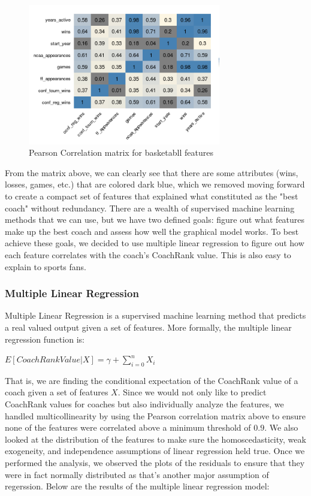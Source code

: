 \documentclass[titlepage,11pt]{article}
\begin{document}
\begin{figure}[H]
      \caption{Pearson Correlation matrix for basketabll features}
      \centering
      \includegraphics[width=0.75\textwidth]{bball_cor.png}
\end{figure}

\noindent From the matrix above, we can clearly see that there are some attributes (wins, losses, games, etc.) that are colored dark blue, which we removed moving forward to create a compact set of features that explained what constituted as the "best coach" without redundancy. There are a wealth of supervised machine learning methods that we can use, but we have two defined goals: figure out what features make up the best coach and assess how well the graphical model works. To best achieve these goals, we decided to use multiple linear regression to figure out how each feature correlates with the coach's CoachRank value. This is also easy to explain to sports fans.

\subsubsection*{Multiple Linear Regression}

Multiple Linear Regression is a supervised machine learning method that predicts a real valued output given a set of features. More formally, the multiple linear regression function is:

\begin{center}
$E[CoachRankValue|X] = \gamma + \sum_{i=0}^{n} X_{i}$
\end{center}

\noindent That is, we are finding the conditional expectation of the CoachRank value of a coach given a set of features $X$. Since we would not only like to predict CoachRank values for coaches but also individually analyze the features, we handled multicollinearity by using the Pearson correlation matrix above to ensure none of the features were correlated above a minimum threshold of $0.9$. We also looked at the distribution of the features to make sure the homoscedasticity, weak exogeneity, and independence assumptions of linear regression held true. Once we performed the analysis, we observed the plots of the residuals to ensure that they were in fact normally distributed as that's another major assumption of regerssion. Below are the results of the multiple linear regression model:
\end{document}
